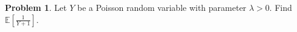 \documentclass[10pt]{article}
\theoremstyle{definition}
\newtheorem{problem}[theorem]{Problem}
\newcommand{\1}[1]{\textbf{1}_{\left[#1\right]}} %
\def\E{\mathbb{E}} %
\begin{document}
\begin{problem}
  Let $Y$ be a Poisson random variable with parameter $\lambda>0$. Find
  $\E\left[\frac{1}{Y+1} \right]$.
\end{problem}




\end{document}
